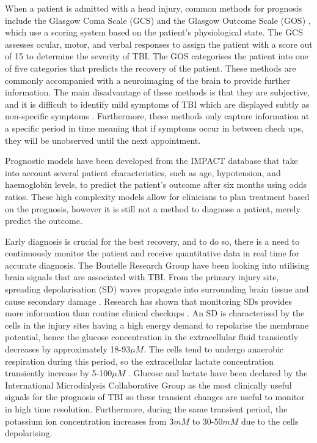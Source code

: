 When a patient is admitted with a head injury, common methods for prognosis include the Glasgow Coma Scale (GCS) \cite{WorldHealthOrganisation2006} and the Glasgow Outcome Scale (GOS) \cite{Jennett1975}, which use a scoring system based on the patient's physiological state. The GCS assesses ocular, motor, and verbal responses to assign the patient with a score out of 15 to determine the severity of TBI. The GOS categorises the patient into one of five categories that predicts the recovery of the patient. These methods are commonly accompanied with a neuroimaging of the brain to provide further information. The main disadvantage of these methods is that they are subjective, and it is difficult to identify mild symptoms of TBI which are displayed subtly as non-specific symptoms \cite{Bettermann2012}. Furthermore, these methods only capture information at a specific period in time meaning that if symptoms occur in between check ups, they will be unobserved until the next appointment. 

Prognostic models \cite{Steyerberg2008} have been developed from the IMPACT database \cite{Maas2007} that take into account several patient characteristics, such as age, hypotension, and haemoglobin levels, to predict the patient's outcome after six months using odds ratios. These high complexity models allow for clinicians to plan treatment based on the prognosis, however it is still not a method to diagnose a patient, merely predict the outcome. 

Early diagnosis is crucial for the best recovery, and to do so, there is a need to continuously monitor the patient and receive quantitative data in real time for accurate diagnosis. The Boutelle Research Group have been looking into utilising brain signals that are associated with TBI. From the primary injury site, spreading depolarisation (SD) waves \cite{Leao1944} propagate into surrounding brain tissue and cause secondary damage \cite{Brain2011}. Research has shown that monitoring SDs provides more information than routine clinical checkups \cite{Hartings2011}. An SD is characterised by the cells in the injury sites having a high energy demand to repolarise the membrane potential, hence the glucose concentration in the extracellular fluid transiently decreases by approximately 18-93$\mu M$. The cells tend to undergo anaerobic respiration during this period, so the extracellular lactate concentration transiently increase by 5-100$\mu M$ \cite{D.2010}. Glucose and lactate have been declared by the International Microdialysis Collaborative Group as the most clinically useful signals for the prognosis of TBI \cite{Hutchinson2015} so these transient changes are useful to monitor in high time resolution. Furthermore, during the same transient period, the potassium ion concentration increases \cite{Rogers2011} from 3$mM$ \cite{Katzman1976} to 30-50$mM$ \cite{Ayata2015} due to the cells depolarising. 


